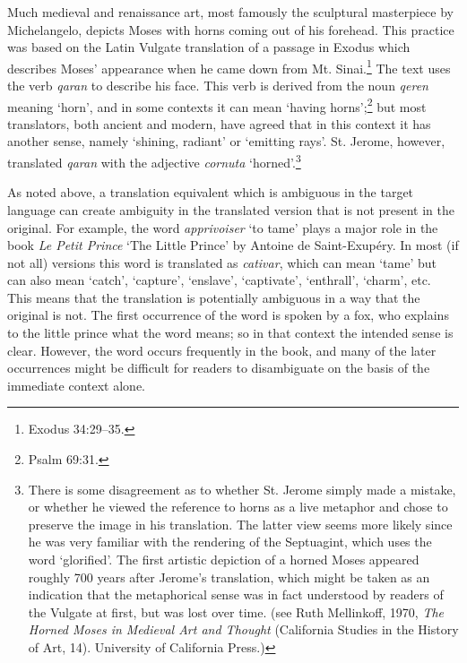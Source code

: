 Much medieval and renaissance art, most famously the sculptural masterpiece by Michelangelo, depicts Moses with horns coming out of his forehead. This practice was based on the  {Latin} Vulgate translation of a passage in Exodus which describes Moses’ appearance when he came down from Mt. Sinai.\footnote{Exodus 34:29--35.} The  text uses the verb \textit{qaran} to describe his face. This verb is derived from the noun \textit{qeren} meaning ‘horn’, and in some contexts it can mean ‘having horns’;\footnote{Psalm 69:31.} but most translators, both ancient and modern, have agreed that in this context it has another sense, namely ‘shining, radiant’ or ‘emitting rays’. St. Jerome, however, translated \textit{qaran} with the  adjective \textit{cornuta} ‘horned’.\footnote{There is some disagreement as to whether St. Jerome simply made a mistake, or whether he viewed the reference to horns as a live metaphor and chose to preserve the image in his translation. The latter view seems more likely since he was very familiar with the rendering of the Septuagint, which uses the word ‘glorified’. The first artistic depiction of a horned Moses appeared roughly 700 years after Jerome’s translation, which might be taken as an indication that the metaphorical sense was in fact understood by readers of the Vulgate at first, but was lost over time. (see Ruth Mellinkoff, 1970, \textit{The Horned Moses in Medieval Art and Thought} (California Studies in the History of Art, 14). University of California Press.)}



As noted above, a translation equivalent which is ambiguous in the target language can create ambiguity in the translated version that is not present in the original. For example, the  word \textit{apprivoiser} ‘to tame’ plays a major role in the book \textit{Le Petit Prince} ‘The Little Prince’ by Antoine de Saint-Exupéry. In most (if not all)  versions this word is translated as \textit{cativar}, which can mean ‘tame’ but can also mean ‘catch’, ‘capture’, ‘enslave’, ‘captivate’, ‘enthrall’, ‘charm’, etc. This means that the translation is potentially ambiguous in a way that the original is not. The first occurrence of the word is spoken by a fox, who explains to the little prince what the word means; so in that context the intended sense is clear. However, the word occurs frequently in the book, and many of the later occurrences might be difficult for readers to disambiguate on the basis of the immediate context alone.



